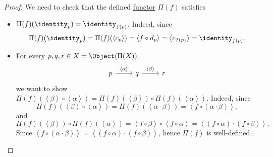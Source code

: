\begin{proof}
	We need to check that the defined \hyperref[def:functor]{functor} \(\Pi (f)\) satisfies
	\begin{itemize}
		\item \(\Pi (f)(\identity_{p} ) = \identity_{f(p)} \). Indeed, since
		      \[
			      \Pi (f)(\identity_{p} ) = \Pi (f)(\left< c_p \right> ) = \left< f\circ d_{p}  \right> = \left< c_{f(p)} \right> = \identity_{f(p)}.
		      \]
		\item For every \(p, q, r\in X = \Object (\Pi (X))\),
		      \[
			      \begin{tikzcd}
				      {p} & {q} & {r}
				      \arrow["\left< \alpha  \right> ", from=1-1, to=1-2]
				      \arrow["\left< \beta  \right> ", from=1-2, to=1-3]
			      \end{tikzcd}
		      \]
		      we want to show \(\Pi (f)\left(\left< \beta  \right> \circ \left< \alpha  \right> \right) = \Pi (f)(\left< \beta  \right> )\circ \Pi (f)(\left< \alpha  \right> )\). Indeed,
		      since
		      \[
			      \Pi (f)\left(\left< \beta  \right> \circ \left< \alpha  \right> \right) = \Pi (f)(\left< \alpha \cdot \beta  \right> ) = \left< f\circ (\alpha \cdot \beta ) \right>,
		      \]
		      and
		      \[
			      \Pi (f)(\left< \beta  \right> )\circ \Pi (f)(\left< \alpha  \right> ) = \left< f\circ \beta  \right> \circ \left< f\circ \alpha  \right> = \left< (f\circ \alpha )\cdot (f\circ \beta ) \right>.
		      \]
		      Since \( \left< f\circ (\alpha \cdot \beta ) \right> = \left< (f\circ \alpha )\cdot (f\circ \beta ) \right>\), hence \(\Pi (f)\) is well-defined.
	\end{itemize}


\end{proof}
